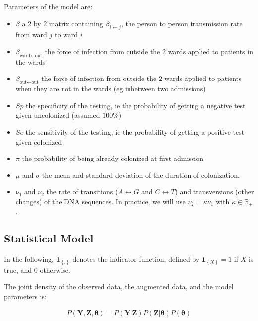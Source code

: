 \documentclass[10pt]{article}
\begin{document}
Parameters of the model are: 
\begin{itemize}
	\item $\beta$ a 2 by 2 matrix containing $\beta_{i \leftarrow j}$, the person to person transmission rate from ward $j$ to ward $i$
	\item $\beta_{\text{ward} \leftarrow \text{out}}$ the force of infection from outside the 2 wards applied to patients in the wards
	\item $\beta_{\text{out} \leftarrow \text{out}}$ the force of infection from outside the 2 wards applied to patients when they are not in the wards (eg inbetween two admissions)
	\item $Sp$ the specificity of the testing, ie the probability of getting a negative test given uncolonized (assumed $100\%$)
	\item $Se$ the sensitivity of the testing, ie the probability of getting a positive test given colonized
	\item $\pi$ the probability of being already colonized at first admission
	\item $\mu$ and $\sigma$ the mean and standard deviation of the duration of colonization.
	\item $\nu_1$ and $\nu_2$ the rate of transitions ($A \leftrightarrow G$ and $C \leftrightarrow T$) and transversions (other changes) of the DNA sequences. In practice, we will use $\nu_2=\kappa\nu_1$ with $\kappa \in \mathbb{R}_+$.
\end{itemize}

\subsection*{Statistical Model}

In the following, $\mathbf{1}_{\left\lbrace.\right\rbrace}$ denotes the indicator function, defined by $\mathbf{1}_{\left\lbrace X \right\rbrace}=1$ if $X$ is true, and $0$ otherwise.

The joint density of the observed data, the augmented data, and the model parameters is: 

\begin{equation} \label {JointDensity}
\begin{split}
P\left(\bm{Y},\bm{Z},\bm{\theta}\right) = P\left(\bm{Y}|\bm{Z}\right)P\left(\bm{Z}|\bm{\theta}\right)P\left(\bm{\theta}\right)\\ \nonumber
\end{split}
\end{equation}
\end{document}
